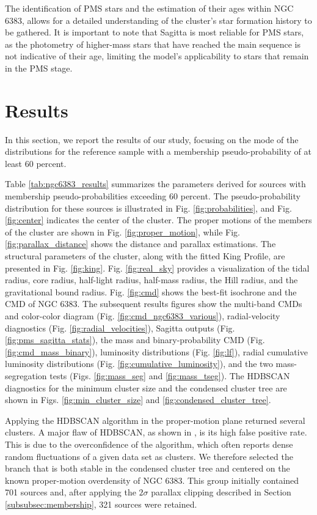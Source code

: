 \documentclass{aa}
\begin{document}
The identification of PMS stars and the estimation of their ages within NGC 6383, allows for a detailed understanding of the cluster's star formation history to be gathered. It is important to note that Sagitta is most reliable for PMS stars, as the photometry of higher-mass stars that have reached the main sequence is not indicative of their age, limiting the model's applicability to stars that remain in the PMS stage.

\section{Results}\label{sec:results}
In this section, we report the results of our study, focusing on the mode of the distributions for the reference sample with a membership pseudo-probability of at least $60$ percent.

Table \ref{tab:ngc6383_results} summarizes the parameters derived for sources with membership pseudo-probabilities exceeding $60$ percent. The pseudo-probability distribution for these sources is illustrated in Fig. \ref{fig:probabilities}, and Fig. \ref{fig:center} indicates the center of the cluster. The proper motions of the members of the cluster are shown in Fig. \ref{fig:proper_motion}, while Fig. \ref{fig:parallax_distance} shows the distance and parallax estimations. The structural parameters of the cluster, along with the fitted King Profile, are presented in Fig. \ref{fig:king}. Fig. \ref{fig:real_sky} provides a visualization of the tidal radius, core radius, half-light radius, half-mass radius, the Hill radius, and the gravitational bound radius. Fig. \ref{fig:cmd} shows the best-fit isochrone and the CMD of NGC 6383. The subsequent results figures show the multi-band CMDs and color-color diagram (Fig. \ref{fig:cmd_ngc6383_various}), radial-velocity diagnostics (Fig. \ref{fig:radial_velocities}), Sagitta outputs (Fig. \ref{fig:pms_sagitta_stats}), the mass and binary-probability CMD (Fig. \ref{fig:cmd_mass_binary}), luminosity distributions (Fig. \ref{fig:lf}), radial cumulative luminosity distributions (Fig. \ref{fig:cumulative_luminosity}), and the two mass-segregation tests (Figs. \ref{fig:mass_seg} and \ref{fig:mass_tseg}). The HDBSCAN diagnostics for the minimum cluster size and the condensed cluster tree are shown in Figs. \ref{fig:min_cluster_size} and \ref{fig:condensed_cluster_tree}.

Applying the HDBSCAN algorithm in the proper-motion plane returned several clusters. A major flaw of HDBSCAN, as shown in \citet{2021A&A...646A.104H}, is its high false positive rate. This is due to the overconfidence of the algorithm, which often reports dense random fluctuations of a given data set as clusters. We therefore selected the branch that is both stable in the condensed cluster tree and centered on the known proper-motion overdensity of NGC 6383. This group initially contained 701 sources and, after applying the $2\sigma$ parallax clipping described in Section \ref{subsubsec:membership}, 321 sources were retained.
\end{document}
